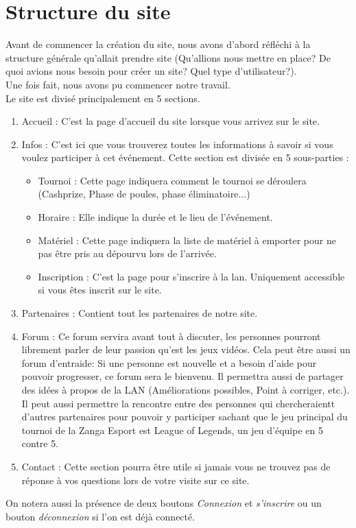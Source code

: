 \documentclass[a4paper, 11pt]{article}
\begin{document}
\section{Structure du site}
Avant de commencer la création du site, nous avons d'abord réfléchi à la structure générale qu'allait prendre site (Qu'allions nous mettre en place?
De quoi avions nous besoin pour créer un site? Quel type d'utilisateur?).\\
Une fois fait, nous avons pu commencer notre travail.\\
Le site est divisé principalement en 5 sections.
\begin{enumerate}
\item Accueil : C'est la page d'accueil du site lorsque vous arrivez sur le site.
\item Infos : C'est ici que vous trouverez toutes les informations à savoir si vous voulez participer à cet événement. Cette section est divisée en 5 sous-parties :
  \begin{itemize}
  \item Tournoi : Cette page indiquera comment le tournoi se déroulera (Cashprize, Phase de poules, phase éliminatoire...)
  \item Horaire : Elle indique la durée et le lieu de l'événement.  
  \item Matériel : Cette page indiquera la liste de matériel à emporter pour ne pas être pris au dépourvu lors de l'arrivée.
  \item Inscription : C'est la page pour s'inscrire à la lan. Uniquement accessible si vous êtes inscrit sur le site.
  \end{itemize}
\item Partenaires : Contient tout les partenaires de notre site.
\item Forum : Ce forum servira avant tout à discuter, les personnes pourront librement parler de leur passion qu'est les jeux vidéos.
  Cela peut être aussi un forum d'entraide: Si une personne est nouvelle et a besoin d'aide pour pouvoir progresser, ce forum sera le bienvenu.
  Il permettra aussi de partager des idées à propos de la LAN (Améliorations possibles, Point à corriger, etc.).
  Il peut aussi permettre la rencontre entre des personnes qui chercheraientt d'autres partenaires pour pouvoir y participer sachant que le jeu principal du tournoi de la Zanga Esport est League of Legends, un jeu d'équipe en 5 contre 5.
\item Contact : Cette section pourra être utile si jamais vous ne trouvez pas de réponse à vos questions lors de votre visite sur ce site.
\end{enumerate}
On notera aussi la présence de deux boutons \textit{Connexion} et \textit{s'inscrire} ou un bouton \textit{déconnexion} si l'on est déjà connecté.
\end{document}
